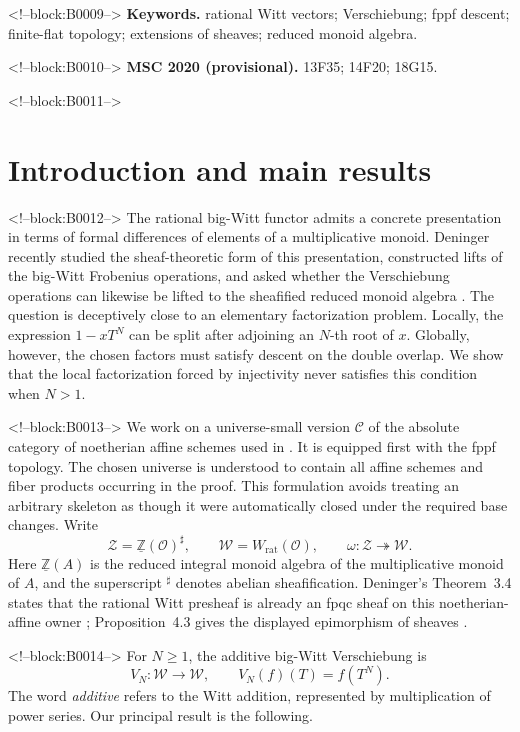 \documentclass[11pt]{article}
\theoremstyle{definition}
\newcommand{\Wrat}{W_{\mathrm{rat}}}
\newcommand{\Zpre}{\underline{\mathbb Z}}
\newcommand{\Zsh}{\mathcal Z}
\newcommand{\Wsh}{\mathcal W}
\newcommand{\sh}{\sharp}
\begin{document}
<!--block:B0009-->
\noindent\textbf{Keywords.}
rational Witt vectors; Verschiebung; fppf descent; finite-flat topology;
extensions of sheaves; reduced monoid algebra.

<!--block:B0010-->
\medskip
\noindent\textbf{MSC 2020 (provisional).}
13F35; 14F20; 18G15.

<!--block:B0011-->
\section{Introduction and main results}

<!--block:B0012-->
The rational big-Witt functor admits a concrete presentation in terms of
formal differences of elements of a multiplicative monoid.  Deninger
recently studied the sheaf-theoretic form of this presentation, constructed
lifts of the big-Witt Frobenius operations, and asked whether the
Verschiebung operations can likewise be lifted to the sheafified reduced
monoid algebra
\cite[p.~25]{Deninger2025Rational}.  The question is deceptively close to
an elementary factorization problem.  Locally, the expression
\(1-xT^N\) can be split after adjoining an \(N\)-th root of \(x\).
Globally, however, the chosen factors must satisfy descent on the double
overlap.  We show that the local factorization forced by injectivity never
satisfies this condition when \(N>1\).

<!--block:B0013-->
We work on a universe-small version \(\mathscr C\) of the absolute category
of noetherian affine schemes used in
\cite[Secs.~3--4]{Deninger2025Rational}.  It is equipped first with the
fppf topology.  The chosen universe is understood to contain all affine
schemes and fiber products occurring in the proof.  This formulation avoids
treating an arbitrary skeleton as though it were automatically closed under
the required base changes.  Write
\[
 \Zsh=\Zpre(\mathcal O)^\sh,\qquad
 \Wsh=\Wrat(\mathcal O),\qquad
 \omega\colon\Zsh\twoheadrightarrow\Wsh .
\]
Here \(\Zpre(A)\) is the reduced integral monoid algebra of the
multiplicative monoid of \(A\), and the superscript \({}^\sh\) denotes
abelian sheafification.  Deninger's Theorem~3.4 states that the rational
Witt presheaf is already an fpqc sheaf on this noetherian-affine owner
\cite[Thm.~3.4, p.~19]{Deninger2025Rational}; Proposition~4.3 gives the
displayed epimorphism of sheaves
\cite[Prop.~4.3, p.~21]{Deninger2025Rational}.

<!--block:B0014-->
For \(N\geq1\), the additive big-Witt Verschiebung is
\[
 V_N\colon\Wsh\longrightarrow\Wsh,\qquad
 V_N(f)(T)=f(T^N).
\]
The word \emph{additive} refers to the Witt addition, represented by
multiplication of power series.  Our principal result is the following.
\end{document}
